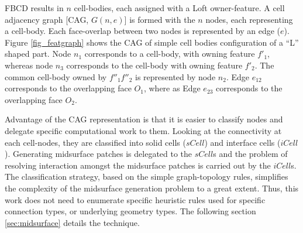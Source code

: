 

FBCD results in $n$ cell-bodies, each assigned with a Loft owner-feature. A cell adjacency graph [CAG, $G(n,e)$] is formed with the $n$ nodes, each representing a cell-body. Each face-overlap between two nodes is represented by an edge ($e$).  Figure \ref{fig_featgraph} shows the CAG of simple cell bodies configuration of a ``L'' shaped part. Node $n_1$ corresponds to a cell-body, with owning feature $f'_1$, whereas node $n_3$ corresponds to the cell-body with owning feature $f'_2$. The common cell-body owned by $ f''_1f''_2$ is represented by node $n_2$.  Edge $e_{12}$ corresponds to the overlapping face $O_1$, where as  Edge $e_{23}$ corresponds to the overlapping face $O_2$. 

Advantage of the CAG representation is that it is easier to classify nodes and delegate specific computational work to them.  Looking at the connectivity at each cell-nodes, they are classified into solid cells ($sCell$) and interface cells ($iCell$).  Generating midsurface patches is delegated to the $sCell$s  and the problem of resolving interaction amongst the midsurface patches is carried out by the $iCell$s. The classification strategy,  based on the simple graph-topology rules, simplifies the complexity of the midsurface generation problem to a great extent.  Thus, this work does not need to enumerate specific heuristic rules used for specific connection types, or underlying geometry types.  The following section \ref{sec:midsurface} details the technique. %



